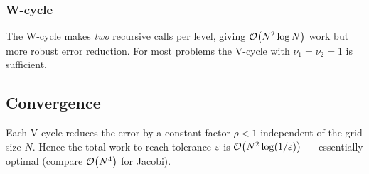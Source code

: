 \subsubsection*{W-cycle}
The W-cycle makes \emph{two} recursive calls per level,
giving $\mathcal{O}\!\left(N^2 \log N\right)$ work but more robust error reduction.
For most problems the V-cycle with $\nu_1=\nu_2=1$ is sufficient.

\subsection{Convergence}\label{subsec:lec16:convergence}

Each V-cycle reduces the error by a constant factor $\rho < 1$
independent of the grid size $N$.  Hence the total work to reach
tolerance $\varepsilon$ is $\mathcal{O}\!\left(N^2 \log(1/\varepsilon)\right)$ — essentially
optimal (compare $\mathcal{O}\!\left(N^4\right)$ for Jacobi).

